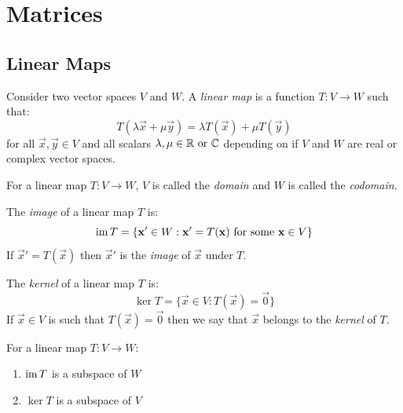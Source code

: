\documentclass[../main.tex]{subfiles}
\begin{document}
\chapter{Matrices}
\section{Linear Maps}
\begin{definition}
  Consider two vector spaces $V$ and $W$.
  A \textit{linear map} is a function $T: V \to W$ such that:
  \[
    T(\lambda\vec{x} + \mu\vec{y}) = \lambda T(\vec{x}) + \mu T(\vec{y})
  \]
  for all $\vec{x}, \vec{y} \in V$ and all scalars $\lambda, \mu \in \mathbb{R} \text{ or }\mathbb{C}$ depending on if $V$ and $W$ are real or complex vector spaces.
\end{definition}
\begin{definition}
  For a linear map $T: V \to W$, $V$ is called the \textit{domain} and $W$ is called the \textit{codomain}.
\end{definition}
\begin{definition}[Image]
  The \textit{image} of a linear map $T$ is:
  \[
    \operatorname{im} T = \{\mathbf{\bm{x}}' \in W : \mathbf{\bm{x}}' = T(\mathbf{\bm{x}}) \text{ for some } \mathbf{\bm{x}} \in V\}
  \]
  If $\vec{x}' = T(\vec{x})$ then $\vec{x}'$ is the \textit{image} of $\vec{x}$ under $T$.
\end{definition}
\begin{definition}[Kernel]
  The \textit{kernel} of a linear map $T$ is:
  \[
    \ker T = \{ \vec{x} \in V : T(\vec{x}) = \vec{0}\}
  \]
  If $\vec{x} \in V$ is such that $T(\vec{x}) = \vec{0}$ then we say that $\vec{x}$ belongs to the \textit{kernel} of $T$.
\end{definition}
\begin{proposition}
  For a linear map $T: V \to W$:
  \begin{enumerate}
    \item $\operatorname{im} T$ is a subspace of $W$
    \item $\ker T$ is a subspace of $V$
  \end{enumerate}
\end{proposition}
\end{document}
